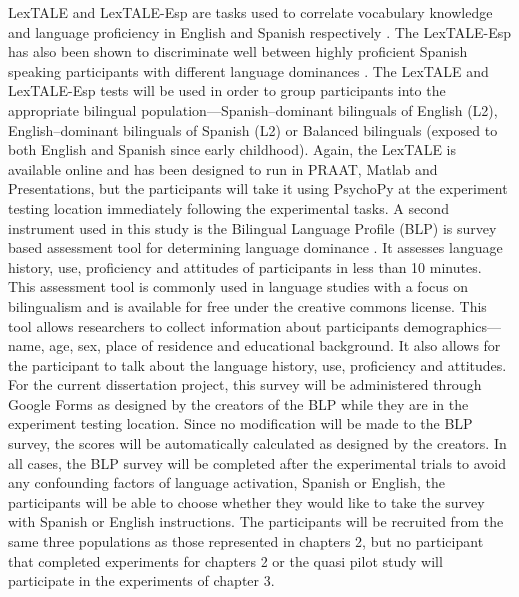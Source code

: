 \documentclass[
12pt, %
english, %
doublespacing, %
nolistspacing, %
liststotoc, %
headsepline, %
chapterinoneline, %
openany, %
]{DoctoralThesis}\usepackage[]{graphicx}\usepackage[]{color}
\begin{document}
LexTALE and LexTALE-Esp are tasks used to correlate vocabulary knowledge and language proficiency in English and Spanish respectively \citep{Izura2014-yw, Lemhofer2012-hz}. The LexTALE-Esp has also been shown to discriminate well between highly proficient Spanish speaking participants with different language dominances \citep{Ferre2017-lp}. The LexTALE and LexTALE-Esp tests will be used in order to group participants into the appropriate bilingual population—Spanish–dominant bilinguals of English (L2), English–dominant bilinguals of Spanish (L2) or Balanced bilinguals (exposed to both English and Spanish since early childhood). Again, the LexTALE is available online and has been designed to run in PRAAT, Matlab and Presentations, but the participants will take it using PsychoPy at the experiment testing location immediately following the experimental tasks. 
A second instrument used in this study is the Bilingual Language Profile (BLP) is survey based assessment tool for determining language dominance \citep{Birdsong2012-wd}. It assesses language history, use, proficiency and attitudes of participants in less than 10 minutes. This assessment tool is commonly used in language studies with a focus on bilingualism and is available for free under the creative commons license. This tool allows researchers to collect information about participants demographics—name, age, sex, place of residence and educational background. It also allows for the participant to talk about the language history, use, proficiency and attitudes. For the current dissertation project, this survey will be administered through Google Forms as designed by the creators of the BLP while they are in the experiment testing location. Since no modification will be made to the BLP survey, the scores will be automatically calculated as designed by the creators. In all cases, the BLP survey will be completed after the experimental trials to avoid any confounding factors of language activation, Spanish or English, the participants will be able to choose whether they would like to take the survey with Spanish or English instructions. The participants will be recruited from the same three populations as those represented in chapters 2, but no participant that completed experiments for chapters 2 or the quasi pilot study will participate in the experiments of chapter 3.



\end{document}
